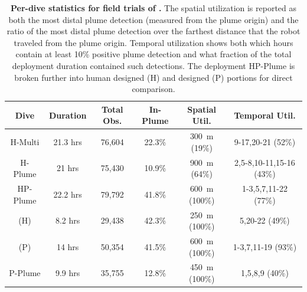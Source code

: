 \begin{table}[h!]
    \centering
    \begin{tabular}{c|c|c|c|c|c}
        Dive & Duration & Total Obs. & In-Plume & Spatial Util. & Temporal Util.  \\
        \hline
        H-Multi & 21.3 hrs & 76,604 & 22.3\% & \SI{300}{\meter} (19\%) & 9-17,20-21 (52\%) \\
        \hline
        H-Plume & 21 hrs & 75,430 & 10.9\% & \SI{900}{\meter} (64\%) & 2,5-8,10-11,15-16 (43\%) \\
        \hline
        HP-Plume & 22.2 hrs & 79,792 & 41.8\% & \SI{600}{\meter} (100\%) & 1-3,5,7,11-22 (77\%) \\
        (H) & 8.2 hrs & 29,438 & 42.3\% & \SI{250}{\meter} (100\%) & 5,20-22 (49\%) \\
        (P) & 14 hrs & 50,354 & 41.5\% & \SI{600}{\meter} (100\%) & 1-3,7,11-19 (93\%)\\
        \hline
        P-Plume & 9.9 hrs & 35,755 & 12.8\% & \SI{450}{\meter} (100\%) & 1,5,8,9 (40\%)
    \end{tabular}
    \caption[Per-dive statistics for field trials of \PHORTEX.]{\textbf{Per-dive statistics for field trials of \PHORTEX.} The spatial utilization is reported as both the most distal plume detection (measured from the plume origin) and the ratio of the most distal plume detection over the farthest distance that the robot traveled from the plume origin. Temporal utilization shows both which hours contain at least 10\% positive plume detection and what fraction of the total deployment duration contained such detections. The deployment HP-Plume is broken further into human designed (H) and \PHORTEX designed (P) portions for direct comparison.}
    \label{tab:field_results}
\end{table}


